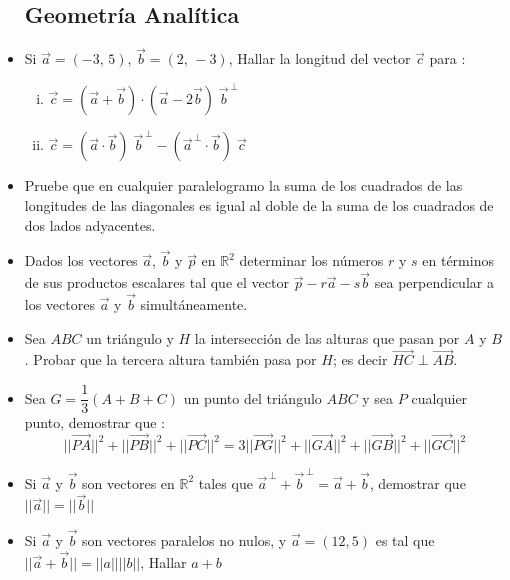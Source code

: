 \documentclass[10pt, twocolumn, landscape, a4paper]{article}
\begin{document}
\begin{itemize}
\subsection*{Geometría Analítica}
\item{Si $\vec{a} = (-3,\,5)$, $\vec{b} = (2,\, -3)$, Hallar la longitud del vector $\vec{c}$ para :
\begin{enumerate}[i. ]
\item $\vec{c} = (\vec{a} + \vec{b}) \cdot (\vec{a} - 2\vec{b})\;\vec{b}^{\,\perp}$
\item $\vec{c} = (\vec{a} \cdot \vec{b})\;\vec{b}^{\,\perp} - (\vec{a}^{\,\perp} \cdot \vec{b})\;\vec{c}$
\end{enumerate}}

\item{Pruebe que en cualquier paralelogramo la suma de los cuadrados de las longitudes de las diagonales es igual al doble de la suma de los cuadrados de dos lados adyacentes.}

\item{Dados los vectores $\vec{a}$, $\vec{b}$ y $\vec{p}$ en $\mathbb{R}^2$ determinar los números $r$ y $s$ en términos de sus productos escalares tal que el vector $\vec{p} - r\vec{a} - s\vec{b}$ sea perpendicular a los vectores $\vec{a}$ y $\vec{b}$ simultáneamente.}

\item{Sea $ABC$ un triángulo y $H$ la intersección de las alturas que pasan por $A$ y $B$. Probar que la tercera altura también pasa por $H$; es decir $\vec{HC} \perp \vec{AB}$.}

\item{ Sea $G = \dfrac1{3} (A + B + C)$ un punto del triángulo $ABC$ y sea $P$ cualquier punto, demostrar que : $$||\overrightarrow{PA}||^2 + ||\overrightarrow{PB}||^2 + ||\overrightarrow{PC}||^2 = 3 ||\overrightarrow{PG}||^2 + ||\overrightarrow{GA}||^2 + ||\overrightarrow{GB}||^2 + ||\overrightarrow{GC}||^2$$}

\item{Si $\vec{a}$ y $\vec{b}$ son vectores en $\mathbb{R}^2$ tales que $\vec{a}^{\,\perp} + \vec{b}^{\,\perp} = \vec{a} + \vec{b}$, demostrar que $||\vec{a}|| = ||\vec{b}||$}

\item{Si $\vec{a}$ y $\vec{b}$  son vectores paralelos no nulos, y $\vec{a} = (12, 5)$ es tal que $||\vec{a} + \vec{b}|| = ||a|| ||b||$, Hallar $a + b$ }
\end{itemize}
\end{document}
